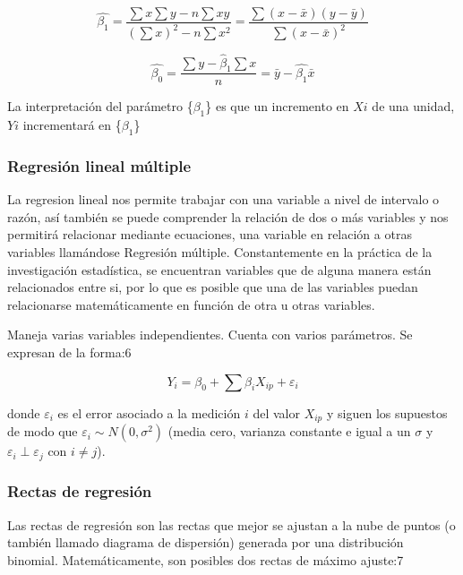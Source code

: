 \documentclass{article}
\begin{document}
\begin{equation}
\hat{\beta_1} = \frac { \sum x \sum y - n \sum xy } { \left ( \sum x \right ) ^ 2 - n \sum x^2 } = \frac{ \sum (x-\bar{x})(y-\bar{y} ) }{\sum ( x - \bar{x})^2 }
\end{equation}

\begin{equation}
\hat{\beta_0} = \frac { \sum y - \hat{\beta}_1 \sum x } { n } = \bar{y} - \hat{\beta_1} \bar{x}
\end{equation}

La interpretación del parámetro \{$\beta_1$\} es que un incremento en
$Xi$ de una unidad, $Yi$ incrementará en \{$\beta_1$\}

\subsubsection{Regresión lineal
múltiple}\label{regresiuxf3n-lineal-muxfaltiple}

La regresion lineal nos permite trabajar con una variable a nivel de
intervalo o razón, así también se puede comprender la relación de dos o
más variables y nos permitirá relacionar mediante ecuaciones, una
variable en relación a otras variables llamándose Regresión múltiple.
Constantemente en la práctica de la investigación estadística, se
encuentran variables que de alguna manera están relacionados entre si,
por lo que es posible que una de las variables puedan relacionarse
matemáticamente en función de otra u otras variables.

Maneja varias variables independientes. Cuenta con varios parámetros. Se
expresan de la forma:6

\begin{equation}
Y_i = \beta_0 + \sum \beta_i X_{ip} + \varepsilon_i
\end{equation}

donde $\varepsilon_i$ es el error asociado a la medición $i$ del valor
$X_{ip}$ y siguen los supuestos de modo que
$\varepsilon_i \sim N(0,\sigma^2)$ (media cero, varianza constante e
igual a un $\sigma$ y $\varepsilon_i \perp \varepsilon_j$ con
$i\neq j$).

\subsubsection{Rectas de regresión}\label{rectas-de-regresiuxf3n}

Las rectas de regresión son las rectas que mejor se ajustan a la nube de
puntos (o también llamado diagrama de dispersión) generada por una
distribución binomial. Matemáticamente, son posibles dos rectas de
máximo ajuste:7
\end{document}
